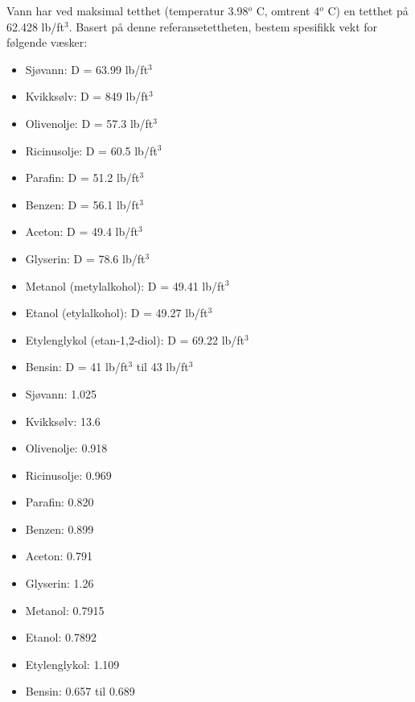 

Vann har ved maksimal tetthet (temperatur 3.98$^{o}$ C, omtrent 4$^{o}$ C) en tetthet på 62.428 lb/ft$^{3}$.  Basert på denne referansetettheten, bestem spesifikk vekt for følgende væsker:

\begin{itemize}
\item{} Sjøvann: D = 63.99 lb/ft$^{3}$
\item{} Kvikksølv: D = 849 lb/ft$^{3}$
\item{} Olivenolje: D = 57.3 lb/ft$^{3}$
\item{} Ricinusolje: D = 60.5 lb/ft$^{3}$
\item{} Parafin: D = 51.2 lb/ft$^{3}$
\item{} Benzen: D = 56.1 lb/ft$^{3}$
\item{} Aceton: D = 49.4 lb/ft$^{3}$
\item{} Glyserin: D = 78.6 lb/ft$^{3}$
\item{} Metanol (metylalkohol): D = 49.41 lb/ft$^{3}$
\item{} Etanol (etylalkohol): D = 49.27 lb/ft$^{3}$
\item{} Etylenglykol (etan-1,2-diol): D = 69.22 lb/ft$^{3}$
\item{} Bensin: D = 41 lb/ft$^{3}$ til 43 lb/ft$^{3}$
\end{itemize}







\begin{itemize}
\item{} Sjøvann: 1.025
\item{} Kvikksølv: 13.6
\item{} Olivenolje: 0.918
\item{} Ricinusolje: 0.969
\item{} Parafin: 0.820
\item{} Benzen: 0.899
\item{} Aceton: 0.791
\item{} Glyserin: 1.26
\item{} Metanol: 0.7915
\item{} Etanol: 0.7892
\item{} Etylenglykol: 1.109
\item{} Bensin: 0.657 til 0.689
\end{itemize}









